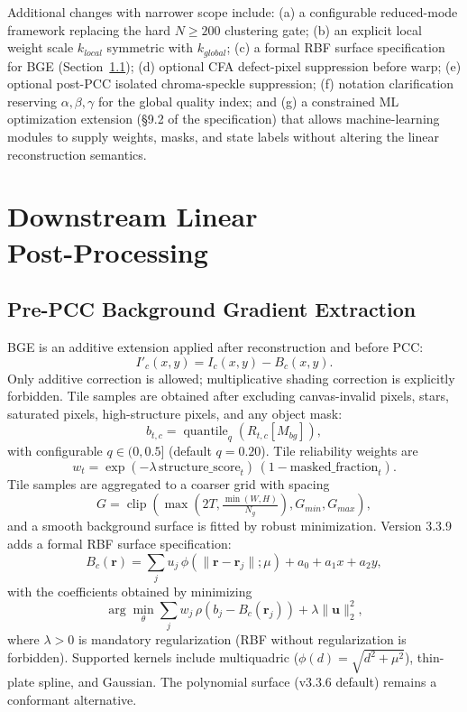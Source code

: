 \documentclass[10pt,twocolumn]{article}
\begin{document}
Additional changes with narrower scope include: (a) a configurable reduced-mode framework
replacing the hard $N\ge200$ clustering gate; (b) an explicit local weight scale $k_{local}$
symmetric with $k_{global}$; (c) a formal RBF surface specification for BGE (Section~\ref{sec:bge});
(d) optional CFA defect-pixel suppression before warp; (e) optional post-PCC isolated
chroma-speckle suppression; (f) notation clarification reserving $\alpha,\beta,\gamma$ for the
global quality index; and (g) a constrained ML optimization extension (§9.2 of the specification)
that allows machine-learning modules to supply weights, masks, and state labels without altering
the linear reconstruction semantics.

\section{Downstream Linear \protect \\Post-Processing}

\subsection{Pre-PCC Background Gradient Extraction}
\label{sec:bge}

BGE is an additive extension applied after reconstruction and before PCC:
\begin{equation}
  I'_c(x,y) = I_c(x,y) - B_c(x,y).
\end{equation}
Only additive correction is allowed; multiplicative shading correction is explicitly forbidden.
Tile samples are obtained after excluding canvas-invalid pixels, stars, saturated pixels,
high-structure pixels, and any object mask:
\begin{equation}
  b_{t,c} = \operatorname{quantile}_q(R_{t,c}[M_{bg}]),
\end{equation}
with configurable $q\in(0,0.5]$ (default $q=0.20$). Tile reliability weights are
\begin{equation}
  w_t = \exp(-\lambda\,\mathrm{structure\_score}_t)\,(1-\mathrm{masked\_fraction}_t).
\end{equation}
Tile samples are aggregated to a coarser grid with spacing
\begin{equation}
  G = \operatorname{clip}\!\left(\max\!\left(2T,\tfrac{\min(W,H)}{N_g}\right),G_{min},G_{max}\right),
\end{equation}
and a smooth background surface is fitted by robust minimization. Version 3.3.9 adds a formal
RBF surface specification:
\begin{equation}
  B_c(\mathbf{r}) = \sum_j u_j\,\phi(\|\mathbf{r}-\mathbf{r}_j\|;\mu) + a_0 + a_1 x + a_2 y,
\end{equation}
with the coefficients obtained by minimizing
\begin{equation}
  \arg\min_{\theta} \sum_j w_j\,\rho(b_j-B_c(\mathbf{r}_j)) + \lambda\|\mathbf{u}\|_2^2,
\end{equation}
where $\lambda>0$ is mandatory regularization (RBF without regularization is forbidden).
Supported kernels include multiquadric ($\phi(d)=\sqrt{d^2+\mu^2}$), thin-plate spline, and
Gaussian. The polynomial surface (v3.3.6 default) remains a conformant alternative.
\end{document}
